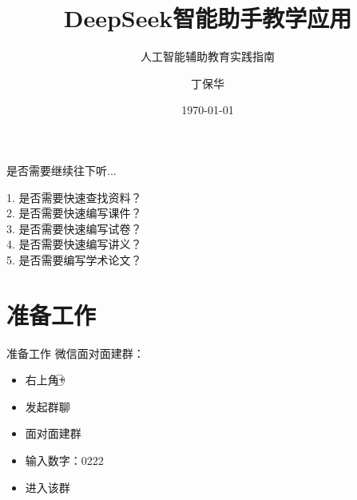 \documentclass[aspectratio=169]{beamer}
\title{DeepSeek智能助手教学应用}
\subtitle{人工智能辅助教育实践指南}
\author{丁保华}
\institute{致慧星空工作室}
\date{\today}
\begin{document}
\maketitle

\begin{frame}[t]{是否需要继续往下听...}
\begin{spacing}{1.2}
1. 是否需要快速查找资料？\\
2. 是否需要快速编写课件？\\
3. 是否需要快速编写试卷？\\
4. 是否需要快速编写讲义？\\
5. 是否需要编写学术论文？\\
\end{spacing}
\end{frame}

\section{准备工作}
\begin{frame}[t]{准备工作}
微信面对面建群：\\
\begin{itemize}
\item 右上角\textcircled{+}
\item 发起群聊
\item 面对面建群
\item 输入数字：\alert{0222}
\item 进入该群
\end{itemize}
\end{frame}
\end{document}
